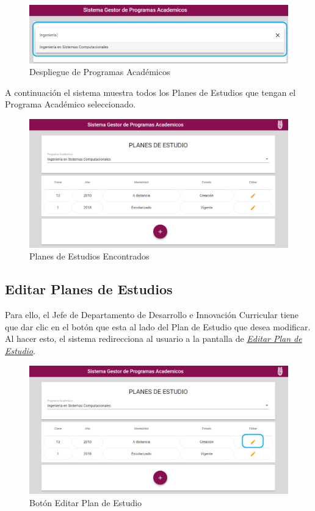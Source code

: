 \begin{figure}[H]
	\centering
	\hypertarget{academico2}{\includegraphics[width=0.7\linewidth]{images/SP4-GPE/programaD}}
	\caption{Despliegue de Programas Académicos}
	\label{academico2}
\end{figure}

A continuación el sistema muestra todos los Planes de Estudios que tengan el Programa Académico seleccionado.
\begin{figure}[H]
	\centering
	\hypertarget{planes}{\includegraphics[width=0.7\linewidth]{images/SP4-GPE/consultar}}
	\caption{Planes de Estudios Encontrados}
	\label{planes}
\end{figure}
\newpage
\subsection{Editar Planes de Estudios}

Para ello, el Jefe de Departamento de Desarrollo e Innovación Curricular tiene que dar clic en el botón  que esta al lado del Plan de Estudio que desea modificar. Al hacer esto, el sistema redirecciona al usuario a la pantalla de \hyperlink{editarPE}{\textit{Editar Plan de Estudio}}.

\begin{figure}[H]
	\centering
	\hypertarget{editar}{\includegraphics[width=0.7\linewidth]{images/SP4-GPE/editarC}}
	\caption{Botón Editar Plan de Estudio}
	\label{editar}
\end{figure}

